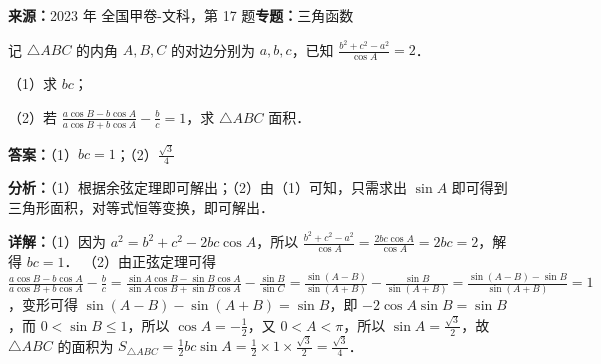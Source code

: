 \begin{question}
\textbf{来源：}2023 年 全国甲卷-文科，第 17 题\quad \textbf{专题：}三角函数\par
记 $\triangle ABC$ 的内角 $A,B,C$ 的对边分别为 $a,b,c$，已知 $\frac{b^2+c^2-a^2}{\cos A}=2$．

（1）求 $bc$；

（2）若 $\frac{a\cos B-b\cos A}{a\cos B+b\cos A}-\frac{b}{c}=1$，求 $\triangle ABC$ 面积．
\begin{solution}
\textbf{答案：}（1）$bc=1$；（2）$\frac{\sqrt{3}}{4}$

\textbf{分析：}（1）根据余弦定理即可解出；（2）由（1）可知，只需求出 $\sin A$ 即可得到三角形面积，对等式恒等变换，即可解出．

\textbf{详解：}（1）因为 $a^2=b^2+c^2-2bc\cos A$，所以 $\frac{b^2+c^2-a^2}{\cos A}=\frac{2bc\cos A}{\cos A}=2bc=2$，解得 $bc=1$．
（2）由正弦定理可得 $\frac{a\cos B-b\cos A}{a\cos B+b\cos A}-\frac{b}{c}=\frac{\sin A\cos B-\sin B\cos A}{\sin A\cos B+\sin B\cos A}-\frac{\sin B}{\sin C}=\frac{\sin(A-B)}{\sin(A+B)}-\frac{\sin B}{\sin(A+B)}=\frac{\sin(A-B)-\sin B}{\sin(A+B)}=1$，变形可得 $\sin(A-B)-\sin(A+B)=\sin B$，即 $-2\cos A\sin B=\sin B$，而 $0<\sin B\le1$，所以 $\cos A=-\frac{1}{2}$，又 $0<A<\pi$，所以 $\sin A=\frac{\sqrt{3}}{2}$，故 $\triangle ABC$ 的面积为 $S_{\triangle ABC}=\frac{1}{2}bc\sin A=\frac{1}{2}\times1\times\frac{\sqrt{3}}{2}=\frac{\sqrt{3}}{4}$．
\end{solution}
\end{question}

